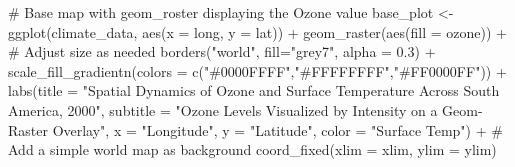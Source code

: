 \documentclass[
  letterpaper,
  DIV=11,
  numbers=noendperiod]{scrartcl}
\newenvironment{Shaded}{\begin{snugshade}}{\end{snugshade}}
\newcommand{\AttributeTok}[1]{\textcolor[rgb]{0.40,0.45,0.13}{#1}}
\newcommand{\CommentTok}[1]{\textcolor[rgb]{0.37,0.37,0.37}{#1}}
\newcommand{\FloatTok}[1]{\textcolor[rgb]{0.68,0.00,0.00}{#1}}
\newcommand{\FunctionTok}[1]{\textcolor[rgb]{0.28,0.35,0.67}{#1}}
\newcommand{\NormalTok}[1]{\textcolor[rgb]{0.00,0.23,0.31}{#1}}
\newcommand{\OtherTok}[1]{\textcolor[rgb]{0.00,0.23,0.31}{#1}}
\newcommand{\SpecialCharTok}[1]{\textcolor[rgb]{0.37,0.37,0.37}{#1}}
\newcommand{\StringTok}[1]{\textcolor[rgb]{0.13,0.47,0.30}{#1}}
\begin{document}
\begin{Shaded}
\begin{Highlighting}[]
\CommentTok{\# Base map with geom\_roster displaying the Ozone value}
\NormalTok{base\_plot }\OtherTok{\textless{}{-}} \FunctionTok{ggplot}\NormalTok{(climate\_data, }\FunctionTok{aes}\NormalTok{(}\AttributeTok{x =}\NormalTok{ long, }\AttributeTok{y =}\NormalTok{ lat)) }\SpecialCharTok{+}
  \FunctionTok{geom\_raster}\NormalTok{(}\FunctionTok{aes}\NormalTok{(}\AttributeTok{fill =}\NormalTok{ ozone)) }\SpecialCharTok{+} \CommentTok{\# Adjust \textquotesingle{}size\textquotesingle{} as needed}
  \FunctionTok{borders}\NormalTok{(}\StringTok{"world"}\NormalTok{, }\AttributeTok{fill=}\StringTok{"grey7"}\NormalTok{, }\AttributeTok{alpha =} \FloatTok{0.3}\NormalTok{) }\SpecialCharTok{+}
  \FunctionTok{scale\_fill\_gradientn}\NormalTok{(}\AttributeTok{colors =} \FunctionTok{c}\NormalTok{(}\StringTok{"\#0000FFFF"}\NormalTok{,}\StringTok{"\#FFFFFFFF"}\NormalTok{,}\StringTok{"\#FF0000FF"}\NormalTok{)) }\SpecialCharTok{+}
  \FunctionTok{labs}\NormalTok{(}\AttributeTok{title =} \StringTok{"Spatial Dynamics of Ozone and Surface Temperature Across }
\StringTok{South America, 2000"}\NormalTok{,}
       \AttributeTok{subtitle =} \StringTok{"Ozone Levels Visualized by Intensity on a Geom{-}Raster Overlay"}\NormalTok{,}
       \AttributeTok{x =} \StringTok{"Longitude"}\NormalTok{, }\AttributeTok{y =} \StringTok{"Latitude"}\NormalTok{,}
       \AttributeTok{color =} \StringTok{"Surface Temp"}\NormalTok{) }\SpecialCharTok{+} \CommentTok{\# Add a simple world map as background}
  \FunctionTok{coord\_fixed}\NormalTok{(}\AttributeTok{xlim =}\NormalTok{ xlim, }\AttributeTok{ylim =}\NormalTok{ ylim) }
\end{Highlighting}
\end{Shaded}
\end{document}

